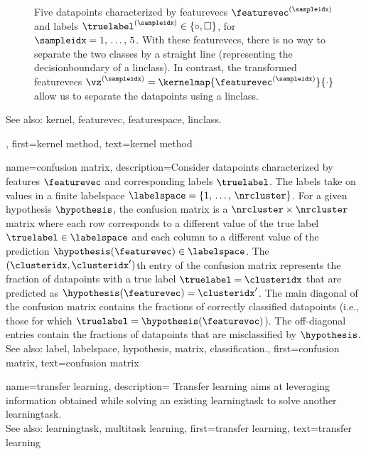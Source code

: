{{\begin{figure}[H]
\begin{center}
\end{center}
\caption{
Five \glspl{datapoint} characterized by \glspl{featurevec} $\featurevec^{(\sampleidx)}$ 
and \glspl{label} $\truelabel^{(\sampleidx)} \in \{ \circ, \square \}$, for $\sampleidx=1, \,\ldots, \,5$. 
With these \glspl{featurevec}, there is no way to separate the two classes 
by a straight line (representing the \gls{decisionboundary} of a \gls{linclass}). 
In contrast, the transformed \glspl{featurevec} $\vz^{(\sampleidx)} = \kernelmap{\featurevec^{(\sampleidx)}}{\cdot}$ 
allow us to separate the \glspl{datapoint} using a \gls{linclass}.  \label{fig_linsep_kernel_dict}}
\end{figure}
		See also: \gls{kernel}, \gls{featurevec}, \gls{featurespace}, \gls{linclass}.},
	first={kernel method},
	text={kernel method} 
}
	

{name={confusion matrix}, 
	description={Consider \glspl{datapoint} characterized 
		by \glspl{feature} $\featurevec$ and corresponding \glspl{label} $\truelabel$. 
		The \glspl{label} take on values in a finite \gls{labelspace} $\labelspace = \{1, \,\ldots, \,\nrcluster\}$. 
		For a given \gls{hypothesis} $\hypothesis$, the confusion \gls{matrix} is a 
		$\nrcluster \times \nrcluster$ \gls{matrix} where each row corresponds to a different 
		value of the true \gls{label} $\truelabel \in \labelspace$ and each column to a 
		different value of the \gls{prediction} $\hypothesis(\featurevec) \in \labelspace$. 
		The $(\clusteridx,\clusteridx')$th entry of the confusion \gls{matrix} represents the fraction of 
		\glspl{datapoint} with a true \gls{label} $\truelabel = \clusteridx$ that are predicted as 
		$\hypothesis(\featurevec) = \clusteridx'$. The main diagonal of the confusion \gls{matrix} 
		contains the fractions of correctly classified \glspl{datapoint} (i.e., those for which 
		$\truelabel = \hypothesis(\featurevec)$). The off-diagonal entries contain the fractions of
		\glspl{datapoint} that are misclassified by $\hypothesis$.
				\\
		See also: \gls{label}, \gls{labelspace}, \gls{hypothesis}, \gls{matrix}, \gls{classification}.},
	first={confusion matrix},
	text={confusion matrix} 
}

{name={transfer learning},
  description=
  {Transfer learning aims at leveraging information obtained while solving an existing \gls{learningtask} to 
   solve another \gls{learningtask}.\\ 
   See also: \gls{learningtask}, \gls{multitask learning}},
  first={transfer learning},
  text={transfer learning}
}



